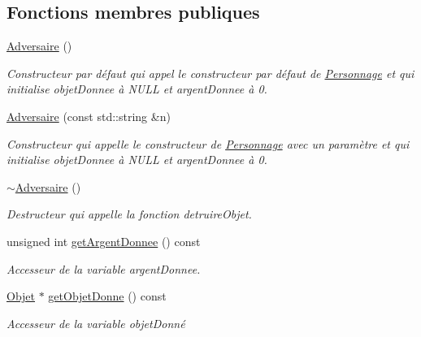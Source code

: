 \subsection*{Fonctions membres publiques}
\begin{DoxyCompactItemize}
\item 
\mbox{\label{class_adversaire_a370755e176eeccec79136e5386231b6a}} 
\hyperlink{class_adversaire_a370755e176eeccec79136e5386231b6a}{Adversaire} ()
\begin{DoxyCompactList}\small\item\em Constructeur par défaut qui appel le constructeur par défaut de \hyperlink{class_personnage}{Personnage} et qui initialise objet\+Donnee à N\+U\+LL et argent\+Donnee à 0. \end{DoxyCompactList}\item 
\hyperlink{class_adversaire_a7db6fc6be761ea8aef77e6b4e582dcf0}{Adversaire} (const std\+::string \&n)
\begin{DoxyCompactList}\small\item\em Constructeur qui appelle le constructeur de \hyperlink{class_personnage}{Personnage} avec un paramètre et qui initialise objet\+Donnee à N\+U\+LL et argent\+Donnee à 0. \end{DoxyCompactList}\item 
\mbox{\label{class_adversaire_a9a60993cd401bb4f74a826228552a731}} 
\hyperlink{class_adversaire_a9a60993cd401bb4f74a826228552a731}{$\sim$\+Adversaire} ()
\begin{DoxyCompactList}\small\item\em Destructeur qui appelle la fonction detruire\+Objet. \end{DoxyCompactList}\item 
unsigned int \hyperlink{class_adversaire_a8b95db33d9233f0edcc2d870cc2242c3}{get\+Argent\+Donnee} () const
\begin{DoxyCompactList}\small\item\em Accesseur de la variable argent\+Donnee. \end{DoxyCompactList}\item 
\hyperlink{class_objet}{Objet} $\ast$ \hyperlink{class_adversaire_a3d500d03df6faf0b30c8be33561f0942}{get\+Objet\+Donne} () const
\begin{DoxyCompactList}\small\item\em Accesseur de la variable objet\+Donné \end{DoxyCompactList}\item 

\end{DoxyCompactItemize}
